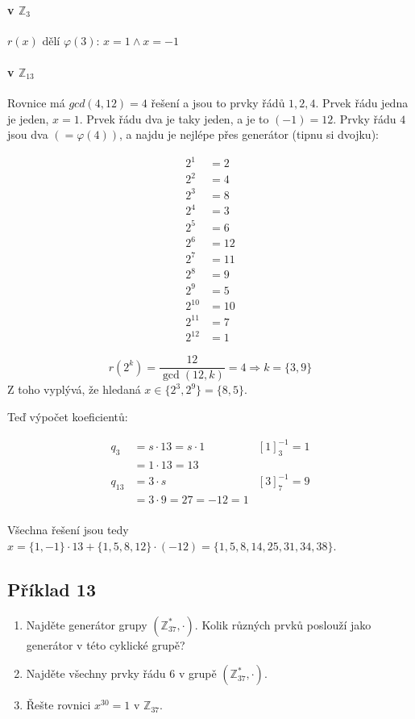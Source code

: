 \documentclass{article}
\begin{document}
\paragraph{v $\mathbb{Z}_3$}
$r(x)$ dělí $\varphi(3)$: $x = 1 \wedge x = -1$ 

\paragraph{v $\mathbb{Z}_{13}$}
Rovnice má $gcd(4,12) = 4$ řešení a jsou to prvky řádů ${1,2,4}$. Prvek řádu jedna je jeden, $x = 1$. Prvek řádu dva je taky jeden, a je to $(-1) = 12$. Prvky řádu $4$ jsou dva $(=\varphi(4))$, a najdu je nejlépe přes generátor (tipnu si dvojku):

\begin{align*}
2^1 &= 2\\
2^2	&= 4\\ 
2^3	&= 8\\
2^4	&= 3\\
2^5	&= 6\\
2^6	&= 12\\
2^7	&= 11\\
2^8	&= 9\\
2^9	&= 5\\
2^{10} &= 10\\
2^{11} &=	7\\
2^{12} &=	1
\end{align*}

\[ r(2^k) = \frac{12}{\gcd(12,k)} = 4 \Rightarrow k = \{3,9\} \]
Z toho vyplývá, že hledaná \(x \in \{2^3, 2^9\} = \{8, 5\}\).

Teď výpočet koeficientů:
 
\begin{align*}
q_3 & = s\cdot 13 = s\cdot 1 & \left[ 1\right]^{-1}_3 = 1\\
		& = 1 \cdot 13 = 13 \\
q_{13} & = 3 \cdot s & \left[ 3\right]^{-1}_{7} = 9\\
		& = 3 \cdot 9 = 27 = -12 = 1 \\
\end{align*}

Všechna řešení jsou tedy $x = \{1,-1\}\cdot 13 + \{1,5,8,12\}\cdot(-12) = \{1,5,8,14,25,31,34,38\}$.

\subsection{Příklad 13}
\begin{enumerate}
	\item Najděte generátor grupy $(\mathbb{Z}_{37}^*, \cdot)$. Kolik různých prvků poslouží jako generátor v této cyklické grupě?
	\item Najděte všechny prvky řádu $6$ v grupě $(\mathbb{Z}_{37}^*, \cdot)$.
	\item Řešte rovnici $x^{30} = 1$ v $\mathbb{Z}_{37}$.
\end{enumerate}
\end{document}
